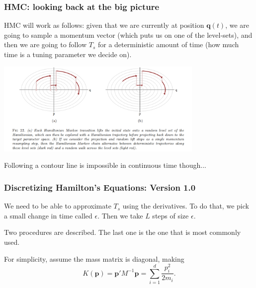 \documentclass{beamer}
\begin{document}
\begin{frame}
\frametitle{HMC: looking back at the big picture}

HMC will work as follows: given that we are currently at position $\mathbf{q}(t)$, we are going to sample a momentum vector (which puts us on one of the level-sets), and then we are going to follow $T_s$ for a deterministic amount of time (how much time is a tuning parameter we decide on).
\newline

\begin{center}
\includegraphics[width=100mm]{1d_algo_vis.png}
\end{center}
\pause

Following a contour line is impossible in continuous time though...
\end{frame}
\begin{frame}
\frametitle{Discretizing Hamilton's Equations: Version 1.0}

We need to be able to approximate $T_s$ using the derivatives. To do that, we pick a small change in time called $\epsilon$. Then we take $L$ steps of size $\epsilon$.
\newline

Two procedures are described. The last one is the one that is most commonly used. 
\newline

For simplicity, assume the mass matrix is diagonal, making
$$
K(\mathbf{p}) = \mathbf{p}'M^{-1}\mathbf{p}  = \sum_{i=1}^d \frac{p_i^2}{2m_i}.
$$


\end{frame}
\end{document}
